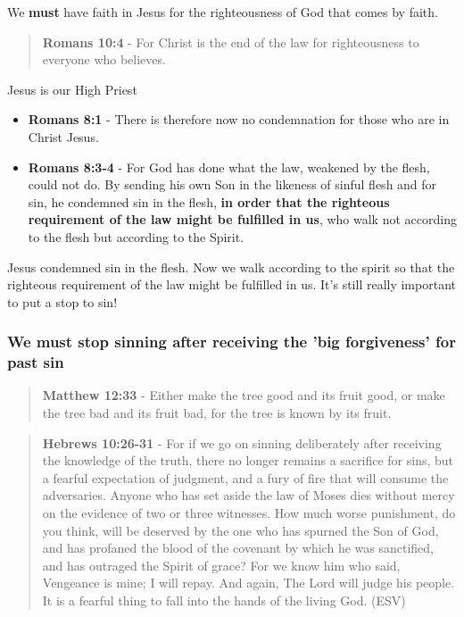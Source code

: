 \documentclass[11pt]{article}
\begin{document}
We \textbf{must} have faith in Jesus for the righteousness of God that comes by faith.

\begin{quote}
\textbf{Romans 10:4} - For Christ is the end of the law for righteousness to everyone who believes.
\end{quote}

Jesus is our High Priest
\begin{itemize}
\item \textbf{Romans 8:1} - There is therefore now no condemnation for those who are in Christ Jesus.
\item \textbf{Romans 8:3-4} - For God has done what the law, weakened by the flesh, could not do. By sending his own Son in the likeness of sinful flesh and for sin, he condemned sin in the flesh, \textbf{in order that the righteous requirement of the law might be fulfilled in us}, who walk not according to the flesh but according to the Spirit.
\end{itemize}

Jesus condemned sin in the flesh. Now we walk according to the spirit so that the righteous requirement of the law might be fulfilled in us.
It's still really important to put a stop to sin!

\subsubsection{We must stop sinning after receiving the 'big forgiveness' for past sin}
\label{sec:org1dbd4d7}
\begin{quote}
\textbf{Matthew 12:33} - Either make the tree good and its fruit good, or make the tree bad and its fruit bad, for the tree is known by its fruit.
\end{quote}

\begin{quote}
\textbf{Hebrews 10:26-31} - For if we go on sinning deliberately after receiving the knowledge of the truth, there no longer remains a sacrifice for sins, but a fearful expectation of judgment, and a fury of fire that will consume the adversaries. Anyone who has set aside the law of Moses dies without mercy on the evidence of two or three witnesses. How much worse punishment, do you think, will be deserved by the one who has spurned the Son of God, and has profaned the blood of the covenant by which he was sanctified, and has outraged the Spirit of grace? For we know him who said, Vengeance is mine; I will repay. And again, The Lord will judge his people. It is a fearful thing to fall into the hands of the living God. (ESV)
\end{quote}
\end{document}
